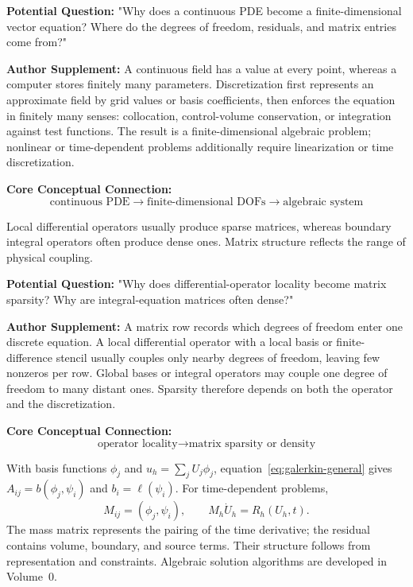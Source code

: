 \begin{authornote}
\textbf{Potential Question:}
"Why does a continuous PDE become a finite-dimensional vector equation? Where do the degrees of freedom, residuals, and matrix entries come from?"

\textbf{Author Supplement:}
A continuous field has a value at every point, whereas a computer stores finitely many parameters. Discretization first represents an approximate field by grid values or basis coefficients, then enforces the equation in finitely many senses: collocation, control-volume conservation, or integration against test functions. The result is a finite-dimensional algebraic problem; nonlinear or time-dependent problems additionally require linearization or time discretization.

\textbf{Core Conceptual Connection:}
\[
\text{continuous PDE}
\longrightarrow
\text{finite-dimensional DOFs}
\longrightarrow
\text{algebraic system}
\]
\end{authornote}

Local differential operators usually produce sparse matrices, whereas boundary integral operators often produce dense ones. Matrix structure reflects the range of physical coupling.

\begin{authornote}
\textbf{Potential Question:}
"Why does differential-operator locality become matrix sparsity? Why are integral-equation matrices often dense?"

\textbf{Author Supplement:}
A matrix row records which degrees of freedom enter one discrete equation. A local differential operator with a local basis or finite-difference stencil usually couples only nearby degrees of freedom, leaving few nonzeros per row. Global bases or integral operators may couple one degree of freedom to many distant ones. Sparsity therefore depends on both the operator and the discretization.

\textbf{Core Conceptual Connection:}
\[
\text{operator locality}
\longrightarrow
\text{matrix sparsity or density}
\]
\end{authornote}


With basis functions $\phi_j$ and $u_h=\sum_jU_j\phi_j$, equation~\eqref{eq:galerkin-general} gives
$A_{ij}=b(\phi_j,\psi_i)$ and $b_i=\ell(\psi_i)$.
For time-dependent problems,
\[
M_{ij}=(\phi_j,\psi_i),\qquad M_h\dot U_h=R_h(U_h,t).
\]
The mass matrix represents the pairing of the time derivative; the residual contains volume, boundary, and source terms.
Their structure follows from representation and constraints. Algebraic solution algorithms are developed in Volume~0.
